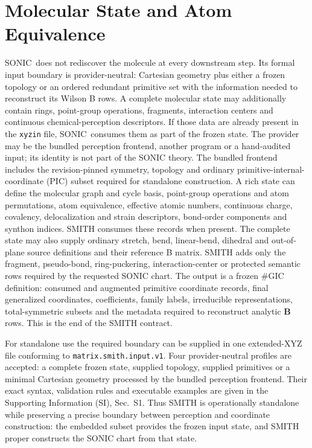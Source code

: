 \documentclass[journal=jctcce,manuscript=article,layout=traditional]{achemso}
\newcommand{\SONIC}{SONIC}
\newcommand{\Bmat}{\mathbf{B}}
\theoremstyle{definition}
\begin{document}
\section{Molecular State and Atom Equivalence}

\SONIC\ does not rediscover the molecule at every downstream step.  Its formal
input boundary is provider-neutral: Cartesian geometry plus either a frozen
topology or an ordered redundant primitive set with the information needed to
reconstruct its Wilson B rows.  A complete molecular state may additionally
contain rings, point-group operations, fragments, interaction centers and
continuous chemical-perception descriptors.  If those data are already
present in the \texttt{xyzin} file, \SONIC\ consumes them as part of the frozen
state.  The provider may be the bundled perception frontend, another program or a
hand-audited input; its identity is not part of the SONIC theory.  The bundled
frontend includes the revision-pinned symmetry, topology and ordinary
primitive-internal-coordinate (PIC) subset required for standalone
construction.  A rich state
can define the molecular graph and cycle basis, point-group operations and atom
permutations, atom equivalence, effective atomic numbers, continuous charge,
covalency, delocalization and strain descriptors, bond-order components and
synthon indices.  SMITH consumes these records when present.  The complete
state may also supply ordinary stretch, bend, linear-bend, dihedral and
out-of-plane source definitions and their reference B matrix.  SMITH adds only
the fragment, pseudo-bond, ring-puckering, interaction-center or protected
semantic rows required by the requested SONIC chart.
The output is a frozen \(\#\)GIC definition: consumed and augmented primitive coordinate records,
final generalized coordinates, coefficients, family labels, irreducible
representations, total-symmetric subsets and the metadata required to
reconstruct analytic \(\Bmat\) rows.  This is the end of the SMITH contract.

For standalone use the required boundary can be supplied in one extended-XYZ
file conforming to \texttt{matrix.smith.input.v1}.  Four provider-neutral
profiles are accepted: a complete frozen state, supplied topology, supplied
primitives or a minimal Cartesian geometry processed by the bundled perception
frontend.  Their exact syntax, validation rules and executable examples are
given in the Supporting Information (SI), Sec.~S1.  Thus SMITH is operationally
standalone while preserving a precise boundary between perception and
coordinate construction: the embedded subset provides the frozen input state,
and SMITH proper constructs the SONIC chart from that state.
\end{document}

